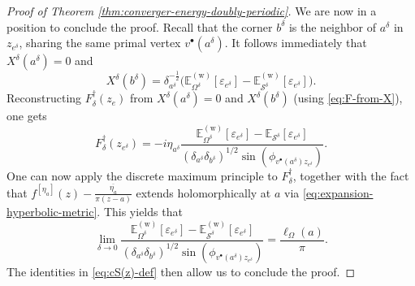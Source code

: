 \documentclass[reqno]{amsart}
\numberwithin{equation}{section}
\theoremstyle{definition}
\theoremstyle{remark}
\newcommand\cS{\mathcal{S}}
\begin{document}
\begin{proof}[Proof of Theorem \ref{thm:converger-energy-doubly-periodic}]
We are now in a position to conclude the proof. Recall that the corner $b^\delta$ is the neighbor of $a^\delta$ in $z_{e^\delta}$, sharing the same primal vertex $v^\bullet(a^\delta)$. It follows immediately that $X^\delta(a^\delta) = 0$ and 
\[
X^\delta(b^\delta) = \delta_{a^\delta}^{-\frac{1}{2}} \big( \mathbb{E}^{(\mathrm{w})}_{\Omega^\delta}[\varepsilon_{e^\delta}] - \mathbb{E}^{(\mathrm{w})}_{\cS^\delta}[\varepsilon_{e^\delta}] \big).
\]
Reconstructing $F^\dagger_\delta (z_e)$ from $X^{\delta}(a^\delta)=0$ and $X^{\delta}(b^\delta)$ (using \eqref{eq:F-from-X}),  one gets
\begin{equation}\label{eq:F-dagger-at-singularity}
	F^\dagger_\delta(z_{e^\delta}) = -i\eta_{a^\delta} \frac{\mathbb{E}^{(\mathrm{w})}_{\Omega^\delta}[\varepsilon_{e^\delta}] - \mathbb{E}_{\cS^\delta}[\varepsilon_{e^\delta}]}{(\delta_{a^\delta} \delta_{b^\delta})^{1/2} \sin(\phi_{v^\bullet(a^\delta) z_{e^\delta}})}.
\end{equation}
One can now apply the discrete maximum principle to $F^\dagger_\delta$, together with the fact that $f^{[\eta_a]}(z) - \frac{\overline{\eta_a}}{\pi(z-a)}$ extends holomorphically at $a$ via  \eqref{eq:expansion-hyperbolic-metric}. This yields that
\begin{equation}
	\lim\limits_{\delta \to 0} \frac{\mathbb{E}^{(\mathrm{w})}_{\Omega^\delta}[\varepsilon_{e^\delta}] - \mathbb{E}^{(\mathrm{w})}_{\cS^\delta}[\varepsilon_{e^\delta}]}{(\delta_{a^\delta} \delta_{b^\delta})^{1/2} \sin(\phi_{v^\bullet(a^\delta) z_{e^\delta}})} = \frac{\ell_\Omega(a)}{\pi}.
\end{equation}
The identities in \eqref{eq:cS(z)-def} then allow us to conclude the proof.
\end{proof} 
\end{document}
